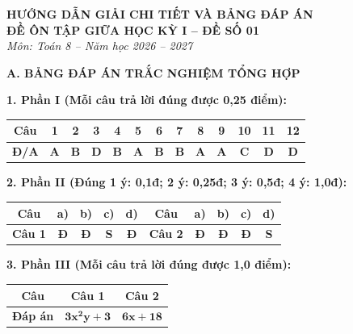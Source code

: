 \documentclass[12pt,a4paper]{article}
\begin{document}
\begin{center}
  \textbf{\Large HƯỚNG DẪN GIẢI CHI TIẾT VÀ BẢNG ĐÁP ÁN}\\
  \textbf{\large ĐỀ ÔN TẬP GIỮA HỌC KỲ I -- ĐỀ SỐ 01}\\
  \textit{Môn: Toán 8 -- Năm học 2026 -- 2027}
\end{center}
\vspace{2mm}

\noindent\textbf{\large A. BẢNG ĐÁP ÁN TRẮC NGHIỆM TỔNG HỢP}
\vspace{1mm}

\noindent\textbf{1. Phần I (Mỗi câu trả lời đúng được 0,25 điểm):}
\begin{center}
\begin{tabular}{|c|c|c|c|c|c|c|c|c|c|c|c|c|}
\hline
\textbf{Câu} & \textbf{1} & \textbf{2} & \textbf{3} & \textbf{4} & \textbf{5} & \textbf{6} & \textbf{7} & \textbf{8} & \textbf{9} & \textbf{10} & \textbf{11} & \textbf{12} \\
\hline
\textbf{Đ/A} & \textbf{A} & \textbf{B} & \textbf{D} & \textbf{B} & \textbf{A} & \textbf{B} & \textbf{B} & \textbf{A} & \textbf{A} & \textbf{C} & \textbf{D} & \textbf{D} \\
\hline
\end{tabular}
\end{center}
\vspace{0.5mm}

\noindent\textbf{2. Phần II (Đúng 1 ý: 0,1đ; 2 ý: 0,25đ; 3 ý: 0,5đ; 4 ý: 1,0đ):}
\begin{center}
\begin{tabular}{|c|c|c|c|c||c|c|c|c|c|}
\hline
\textbf{Câu} & \textbf{a)} & \textbf{b)} & \textbf{c)} & \textbf{d)} & \textbf{Câu} & \textbf{a)} & \textbf{b)} & \textbf{c)} & \textbf{d)} \\
\hline
\textbf{Câu 1} & \textbf{Đ} & \textbf{Đ} & \textbf{S} & \textbf{Đ} & \textbf{Câu 2} & \textbf{Đ} & \textbf{Đ} & \textbf{Đ} & \textbf{S} \\
\hline
\end{tabular}
\end{center}
\vspace{0.5mm}

\noindent\textbf{3. Phần III (Mỗi câu trả lời đúng được 1,0 điểm):}
\begin{center}
\begin{tabular}{|c|c|c|}
\hline
\textbf{Câu} & \textbf{Câu 1} & \textbf{Câu 2} \\
\hline
\textbf{Đáp án} & $\mathbf{3x^2y + 3}$ & $\mathbf{6x + 18}$ \\
\hline
\end{tabular}
\end{center}
\vspace{1.5mm}
\end{document}
